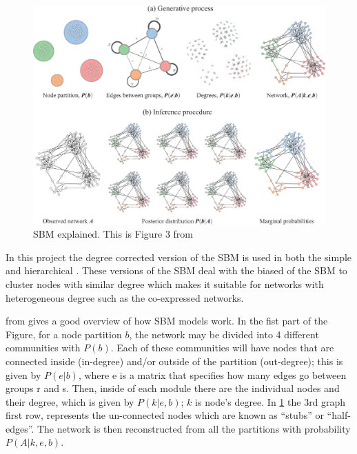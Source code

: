 \begin{figure}[!htb]    
    \centering
    \includegraphics[width=1.0\textwidth,height=1.0\textheight,keepaspectratio]{Sections/Network_I/Resources/dc-sbm_explained.png}
    \caption{SBM explained. This is Figure 3 from \citet{Peixoto2021-jx}}
    \label{fig:N_I:dc-sbm_explained}
\end{figure}


In this project the degree corrected version of the SBM is used in both the simple and hierarchical \citet{Karrer2011-si, Peixoto2014-yb}. These versions of the SBM deal with the biased of the SBM to cluster nodes with similar degree which makes it suitable for networks with heterogeneous degree such as the co-expressed networks.


 from \citet{Peixoto2021-jx} gives a good overview of how SBM models work. In the fist part of the Figure, for a node partition $b$, the network may be divided into 4 different communities with $P(b)$. Each of these communities will have nodes that are connected inside (in-degree) and/or outside of the partition (out-degree); this is given by $P(e|b)$, where e is a matrix that specifies how many edges go between groups r and s. Then, inside of each module there are the individual nodes and their degree, which is given by $ P(k|e,b)$; $k$ is node's degree. In \cref{fig:N_I:dc-sbm_explained} the 3rd graph first row, represents the un-connected nodes which are known as “stubs” or “half-edges”. The network is then reconstructed from all the partitions with probability $P(A|k,e,b)$. 

